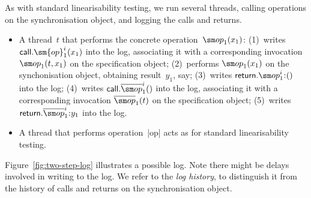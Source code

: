 As with standard linearisability testing, we run several threads, calling
operations on the synchronisation object, and logging the calls and returns. 
%
\begin{itemize}
\item A thread~$t$ that performs the concrete operation~$\op_1(x_1)$: (1)~writes
  $\call.\sm{op}_1^i(x_1)$ into the log, associating it with a corresponding
  invocation $\op_1(t, x_1)$ on the specification object; (2)~performs
  $\op_1(x_1)$ on the synchonisation object, obtaining result~$y_1$, say;
  (3)~writes $\return.\op_1^i \:: ()$ into the log; (4)~writes
  $\call.\overline{\op}_1^i()$ into the log, associating it with a
  corresponding invocation $\overline{\op}_1(t)$ on the specification object;
  (5)~writes $\return.\overline{\op}_1^i \:: y_1$ into the log.

\item A thread that performs operation~|op| acts as for standard
  linearisability testing.
\end{itemize}
%
Figure~\ref{fig:two-step-log} illustrates a possible log.
%
Note there might be delays involved in writing to the log.  We refer to the
\emph{log history}, to distinguish it from the history of calls and returns on
the synchronisation object.  


